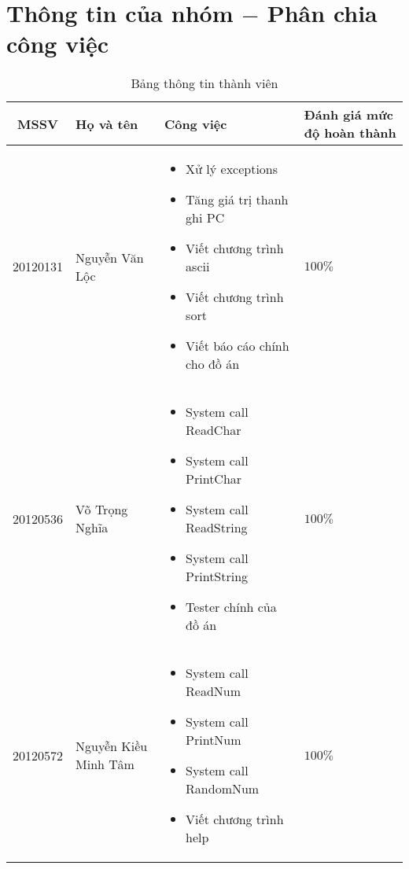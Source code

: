 \section{Thông tin của nhóm $-$ Phân chia công việc}
\begin{table}[H]
\begin{center}
\begin{tabular}{|c| p{}| p{}|p{}|}
\hline 
MSSV & Họ và tên & Công việc & Đánh giá mức độ hoàn thành \\ 
\hline 
20120131 & Nguyễn Văn Lộc & \begin{minipage} [t] {0.4\textwidth} 
      \begin{itemize}
      \item Xử lý exceptions
      \item Tăng giá trị thanh ghi PC
      \item Viết chương trình ascii
      \item Viết chương trình sort
      \item Viết báo cáo chính cho đồ án
     \end{itemize} 
    \end{minipage} & $100\%$\\ 
\hline 
20120536 & Võ Trọng Nghĩa & \begin{minipage}[t]{0.4\textwidth}
\begin{itemize}
\item System call ReadChar
\item System call PrintChar
\item System call ReadString
\item System call PrintString
\item Tester chính của đồ án
\end{itemize}
\end{minipage}  & $100\%$ \\ 
\hline 
20120572 & Nguyễn Kiều Minh Tâm & \begin{minipage}[t]{0.4\textwidth}
\begin{itemize}
\item System call ReadNum
\item System call PrintNum
\item System call RandomNum
\item Viết chương trình help
\end{itemize}
\end{minipage} & $100\%$\\ 
\hline 
\end{tabular}
\caption{Bảng thông tin thành viên} 
\end{center}
\end{table}
